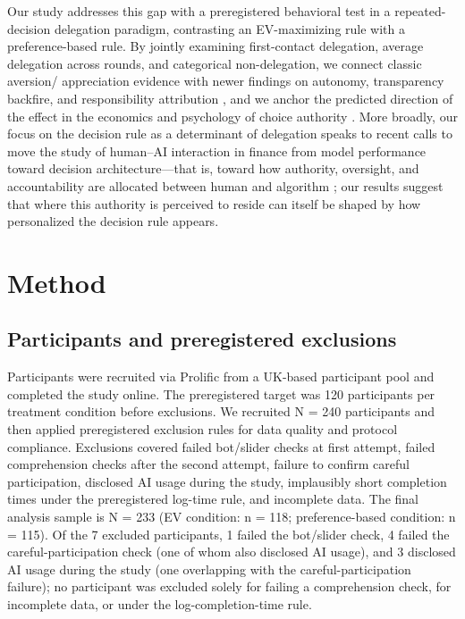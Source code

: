 \documentclass[a4paper, 12pt, fleqn]{article}
\theoremstyle{definition}
\newcommand{\inew}[1]{{\color{blue} #1\color{black}}}
\begin{document}
Our study addresses this gap with a preregistered behavioral test in a repeated-decision delegation paradigm, contrasting an EV-maximizing rule with a preference-based rule. By jointly examining first-contact delegation, average delegation across rounds, and categorical non-delegation, we connect classic aversion/ appreciation evidence with newer findings on autonomy, transparency backfire, and responsibility attribution \citep{Logg2019,Fink2024,Hu2024,Gazit2023}, and we anchor the predicted direction of the effect in the economics and psychology of choice authority \citep{Brehm1966,DeciRyan2000,FreyBenzStutzer2004,Leotti2010,Bartling2014,Owens2014}. \inew{More broadly, our focus on the decision rule as a determinant of delegation speaks to recent calls to move the study of human--AI interaction in finance from model performance toward decision architecture---that is, toward how authority, oversight, and accountability are allocated between human and algorithm \citep{Kou2026}; our results suggest that where this authority is perceived to reside can itself be shaped by how personalized the decision rule appears.}

\section{Method}
\label{sec:method}

\subsection{Participants and preregistered exclusions}
Participants were recruited via Prolific from a UK-based participant pool and completed the study online. The preregistered target was 120 participants per treatment condition before exclusions. We recruited N = 240 participants and then applied preregistered exclusion rules for data quality and protocol compliance. Exclusions covered failed bot/slider checks at first attempt, failed comprehension checks after the second attempt, failure to confirm careful participation, disclosed AI usage during the study, implausibly short completion times under the preregistered log-time rule, and incomplete data. The final analysis sample is N = 233 (EV condition: n = 118; preference-based condition: n = 115). \inew{Of the 7 excluded participants, 1 failed the bot/slider check, 4 failed the careful-participation check (one of whom also disclosed AI usage), and 3 disclosed AI usage during the study (one overlapping with the careful-participation failure); no participant was excluded solely for failing a comprehension check, for incomplete data, or under the log-completion-time rule.}
\end{document}
